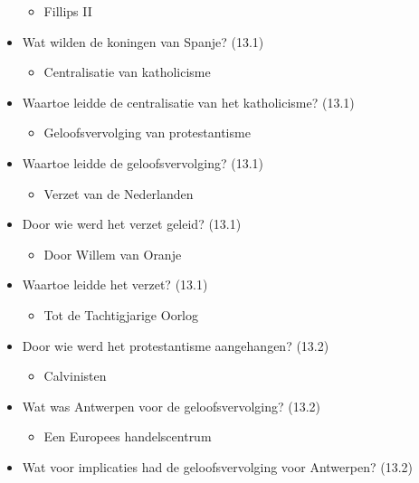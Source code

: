 \begin{itemize}
  \begin{itemize}
  \itemsep1pt\parskip0pt
  \item
    Fillips II
  \end{itemize}
\item
  Wat wilden de koningen van Spanje? (13.1)

  \begin{itemize}
  \itemsep1pt\parskip0pt
  \item
    Centralisatie van katholicisme
  \end{itemize}
\item
  Waartoe leidde de centralisatie van het katholicisme? (13.1)

  \begin{itemize}
  \itemsep1pt\parskip0pt
  \item
    Geloofsvervolging van protestantisme
  \end{itemize}
\item
  Waartoe leidde de geloofsvervolging? (13.1)

  \begin{itemize}
  \itemsep1pt\parskip0pt
  \item
    Verzet van de Nederlanden
  \end{itemize}
\item
  Door wie werd het verzet geleid? (13.1)

  \begin{itemize}
  \itemsep1pt\parskip0pt
  \item
    Door Willem van Oranje
  \end{itemize}
\item
  Waartoe leidde het verzet? (13.1)

  \begin{itemize}
  \itemsep1pt\parskip0pt
  \item
    Tot de Tachtigjarige Oorlog
  \end{itemize}
\item
  Door wie werd het protestantisme aangehangen? (13.2)

  \begin{itemize}
  \itemsep1pt\parskip0pt
  \item
    Calvinisten
  \end{itemize}
\item
  Wat was Antwerpen voor de geloofsvervolging? (13.2)

  \begin{itemize}
  \itemsep1pt\parskip0pt
  \item
    Een Europees handelscentrum
  \end{itemize}
\item
  Wat voor implicaties had de geloofsvervolging voor Antwerpen? (13.2)


\end{itemize}
